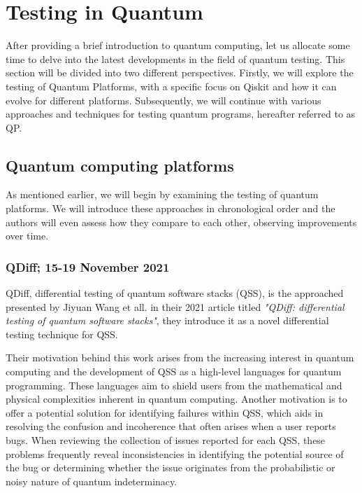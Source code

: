 \cleardoublepage

\chapter{Testing in Quantum}
\label{Ch3:QTesting}

After providing a brief introduction to quantum computing, let us allocate some time to delve into the latest developments in the field of quantum testing. This section will be divided into two different perspectives. Firstly, we will explore the testing of Quantum Platforms, with a specific focus on Qiskit and how it can evolve for different platforms. Subsequently, we will continue with various approaches and techniques for testing quantum programs, hereafter referred to as QP.

\section{Quantum computing platforms}
\label{Ch3.1:TQPlat}

As mentioned earlier, we will begin by examining the testing of quantum platforms. We will introduce these approaches in chronological order and the authors will even assess how they compare to each other, observing improvements over time.

\subsection{QDiff; 15-19 November 2021}
\label{Ch3.1.1:QDiff}

QDiff, differential testing of quantum software stacks (QSS), is the approached presented by Jiyuan Wang et all. in their 2021 article titled \textit{"QDiff: differential testing of quantum software stacks"}\cite{wang2021qdiff}, they introduce it as a novel differential testing technique for QSS.\newline

Their motivation behind this work arises from the increasing interest in quantum computing and the development of QSS as a high-level languages for quantum programming. These languages aim to shield users from the mathematical and physical complexities inherent in quantum computing. Another motivation is to offer a potential solution for identifying failures within QSS, which aids in resolving the confusion and incoherence that often arises when a user reports bugs. When reviewing the collection of issues reported for each QSS, these problems frequently reveal inconsistencies in identifying the potential source of the bug or determining whether the issue originates from the probabilistic or noisy nature of quantum indeterminacy. \newline

